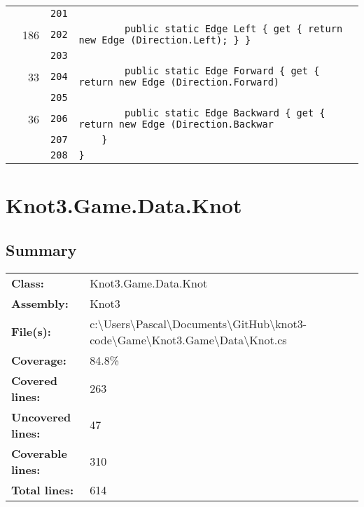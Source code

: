 \documentclass[a4paper,10pt]{article}
\begin{document}
\begin{longtable}[l]{lrrl}
\cellcolor{gray} &  & \verb~201~ & \verb~~\\
\cellcolor{green} & 186 & \verb~202~ & \verb~        public static Edge Left { get { return new Edge (Direction.Left); } }~\\
\cellcolor{gray} &  & \verb~203~ & \verb~~\\
\cellcolor{green} & 33 & \verb~204~ & \verb~        public static Edge Forward { get { return new Edge (Direction.Forward)~\\
\cellcolor{gray} &  & \verb~205~ & \verb~~\\
\cellcolor{green} & 36 & \verb~206~ & \verb~        public static Edge Backward { get { return new Edge (Direction.Backwar~\\
\cellcolor{gray} &  & \verb~207~ & \verb~    }~\\
\cellcolor{gray} &  & \verb~208~ & \verb~}~\\
\end{longtable}
\newpage
\section{Knot3.Game.Data.Knot}
\subsection{Summary}
\begin{longtable}[l]{ll}
\textbf{Class:} & Knot3.Game.Data.Knot\\
\textbf{Assembly:} & Knot3\\
\textbf{File(s):} & \begin{minipage}[t]{12cm}{c:\textbackslash Users\textbackslash Pascal\textbackslash Documents\textbackslash GitHub\textbackslash knot3-code\textbackslash Game\textbackslash Knot3.Game\textbackslash Data\textbackslash Knot.cs}\end{minipage} \\
\textbf{Coverage:} & 84.8\%\\
\textbf{Covered lines:} & 263\\
\textbf{Uncovered lines:} & 47\\
\textbf{Coverable lines:} & 310\\
\textbf{Total lines:} & 614\\
\end{longtable}
\end{document}
